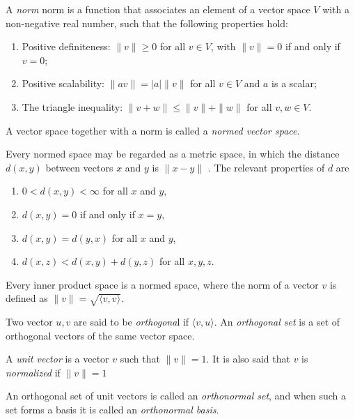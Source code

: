 \begin{definition}
  A \emph{norm} \gls{norm} is a function that associates an element of a vector space $V$ with a non-negative real number, such that the following properties hold:
  \begin{enumerate}
    \item Positive definiteness: $\|v\| \geq 0$ for all $v \in V$, with $\|v\| = 0$ if and only if $v = 0$;
    \item Positive scalability: $\|av\| = |a|\|v\|$ for all $v \in V$ and $a$ is a scalar;
    \item The triangle inequality: $\|v + w\| \leq \|v\| + \|w\|$ for all $v, w \in V$.
  \end{enumerate}
\end{definition}

\begin{definition}
A vector space together with a norm is called a \emph{normed vector space}.
\end{definition}

Every normed space may be regarded as a metric space, in which the
distance $d(x, y)$ between vectors $x$ and $y$ is $\|x-y\|$ . The relevant properties of $d$ are

\begin{enumerate}
  \item $0 < d(x, y) < \infty $ for all $x$ and $y$,
  \item $d(x, y) = 0$ if and only if $x = y$,
  \item $d(x, y) = d(y, x)$ for all $x$ and $y$,
  \item $d(x, z) < d(x, y) + d(y, z)$ for all $x, y, z$.
\end{enumerate}


Every inner product space is a normed space, where the norm of a vector $v$ is defined as $\|v\| = \sqrt{\langle v, v \rangle}$.

\begin{definition}
Two vector $u, v$ are said to be \emph{orthogona}l if $\langle v,u\rangle$. An \emph{orthogonal set} is a set of orthogonal vectors of the same vector space.
\end{definition}

\begin{definition}
  A \emph{unit vector} is a vector $v$ such that $\|v\|  = 1$. It is also said that $v$ is \emph{normalized} if $\|v\|  = 1$
\end{definition}

\begin{definition}
  An orthogonal set of unit vectors is called an \emph{orthonormal set}, and when such a set forms a basis it is called an \emph{orthonormal basis}.
\end{definition}

